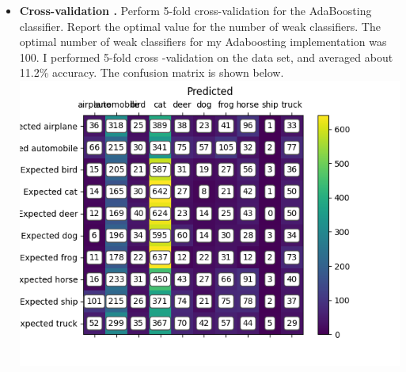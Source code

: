 \documentclass[11pt]{article}
\begin{document}
\begin{itemize}
        \item \textbf{Cross-validation .} Perform 5-fold cross-validation for the AdaBoosting classifier.
        Report the optimal value for the number of weak classifiers.
        The optimal number of weak classifiers for my Adaboosting implementation was 100. I performed 5-fold cross
        -validation on the data set, and averaged about 11.2\% accuracy. The confusion matrix is shown below.\newline
        \includegraphics[width=\textwidth]{Output Pictures/Confusion Matrix AdaBoost}
    \end{itemize}
\end{document}
